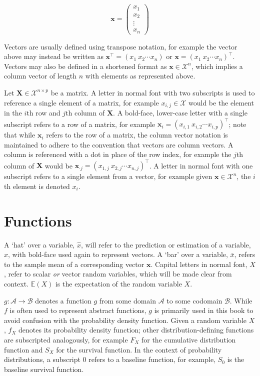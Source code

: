 \documentclass[
  letterpaper,
  krantz2]{style/krantz}
\begin{document}
\[
\mathbf{x}= \begin{pmatrix}
        x_1 \\
        x_2 \\
        \vdots \\
        x_n
      \end{pmatrix}
\]

Vectors are usually defined using transpose notation, for example the
vector above may instead be written as
\(\mathbf{x}^\top= (x_1 \ x_2 \cdots x_n)\) or
\(\mathbf{x}= (x_1 \ x_2 \cdots x_n)^\top\). Vectors may also be defined
in a shortened format as \(\mathbf{x}\in \mathcal{X}^n\), which implies
a column vector of length \(n\) with elements as represented above.

Let \(\mathbf{X}\in \mathcal{X}^{n \times p}\) be a matrix. A letter in
normal font with two subscripts is used to reference a single element of
a matrix, for example \(x_{i,j} \in \mathcal{X}\) would be the element
in the \(i\)th row and \(j\)th column of \(\mathbf{X}\). A bold-face,
lower-case letter with a single subscript refers to a row of a matrix,
for example \(\mathbf{x}_i = (x_{i,1} \ x_{i,2} \cdots x_{i,p})^\top\);
note that while \(\mathbf{x}_i\) refers to the row of a matrix, the
column vector notation is maintained to adhere to the convention that
vectors are column vectors. A column is referenced with a dot in place
of the row index, for example the \(j\)th column of \(\mathbf{X}\) would
be \(\mathbf{x}_{\cdot j} = (x_{1,j} \ x_{2,j} \cdots x_{n,j})^\top\). A
letter in normal font with one subscript refers to a single element from
a vector, for example given \(\mathbf{x}\in \mathcal{X}^n\), the \(i\)th
element is denoted \(x_i\).

\section*{Functions}\label{functions}


A `hat' over a variable, \(\hat{x}\), will refer to the prediction or
estimation of a variable, \(x\), with bold-face used again to represent
vectors. A `bar' over a variable, \(\bar{x}\), refers to the sample mean
of a corresponding vector \(\mathbf{x}\). Capital letters in normal
font, \(X\), refer to scalar \emph{or} vector random variables, which
will be made clear from context. \(\mathbb{E}(X)\) is the expectation of
the random variable \(X\).

\(g: \mathcal{A} \rightarrow \mathcal{B}\) denotes a function \(g\) from
some domain \(\mathcal{A}\) to some codomain \(\mathcal{B}\). While
\(f\) is often used to represent abstract functions, \(g\) is primarily
used in this book to avoid confusion with the probability density
function. Given a random variable \(X\), \(f_X\) denotes its probability
density function; other distribution-defining functions are subscripted
analogously, for example \(F_X\) for the cumulative distribution
function and \(S_X\) for the survival function. In the context of
probability distributions, a subscript \(0\) refers to a baseline
function, for example, \(S_0\) is the baseline survival function.
\end{document}
